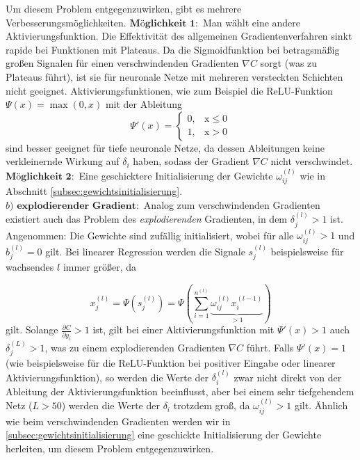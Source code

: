 Um diesem Problem entgegenzuwirken, gibt es mehrere Verbesserungsmöglichkeiten.\linebreak
$\textbf{Möglichkeit 1}:$ Man wählt eine andere Aktivierungsfunktion. Die Effektivität des allgemeinen
Gradientenverfahren sinkt rapide bei Funktionen mit Plateaus. Da die Sigmoidfunktion bei betragsmäßig großen Signalen
für einen verschwindenden Gradienten $\nabla C$ sorgt (was zu Plateaus führt), ist sie für neuronale Netze mit mehreren
versteckten Schichten nicht geeignet. Aktivierungsfunktionen, wie zum Beispiel die ReLU-Funktion $\Psi(x)=\max(0,x)$ mit
der Ableitung
\[
    \Psi'(x)= \begin {cases} 0, &\text{x}\leq 0\\ 1, &\text{x}>0\end{cases}
\]
sind besser geeignet für tiefe neuronale Netze, da dessen Ableitungen keine verkleinernde Wirkung auf $\delta_i$ haben,
sodass der Gradient $\nabla C$ nicht verschwindet.\\
$\textbf{Möglichkeit 2}:$ Eine geschicktere Initialisierung der Gewichte $\omega_{ij}^{(l)}$ wie in Abschnitt
\ref{subsec:gewichtsinitialisierung}.\\
$b)$ $\textbf{explodierender Gradient}:$
Analog zum verschwindenden Gradienten existiert auch das Problem des \textit{explodierenden} Gradienten, in dem
$\delta_j^{(l)}>1$ ist.\\
Angenommen: Die Gewichte sind zufällig initialisiert, wobei für alle $\omega_{ij}^{(l)}>1$ und $b_j^{(l)}=0$
gilt. Bei linearer Regression werden die Signale $s_j^{(l)}$  beispielsweise für wachsendes $l$ immer größer, da

\[
    x_j^{(l)}=\Psi(s_j^{(l)})=\Psi\left( \sum\limits_{i=1}^{n^{(l)}} \underbrace{\omega_{ij}^{(l)}x_{i}^{(l-1)}}_{>1} \right)
\]
gilt. Solange $\frac{\partial C}{\partial y_i} > 1$ ist, gilt bei einer Aktivierungsfunktion mit $\Psi'(x)>1$ auch $\delta_j^{(L)}>1$,
was zu einem explodierenden Gradienten $\nabla C$ führt. Falls $\Psi'(x)=1$ (wie beispielsweise für die ReLU-Funktion bei
positiver Eingabe oder linearer Aktivierungsfunktion), so werden die Werte der $\delta_i^{(l)}$ zwar nicht direkt von der Ableitung
der Aktivierungsfunktion beeinflusst, aber bei einem sehr tiefgehendem Netz ($L>50$) werden die Werte der $\delta_i$ trotzdem
groß, da $\omega_{ij}^{(l)}>1$ gilt. Ähnlich wie beim verschwindenden Gradienten werden wir in
\ref{subsec:gewichtsinitialisierung} eine geschickte Initialisierung der Gewichte herleiten, um diesem Problem
entgegenzuwirken.

